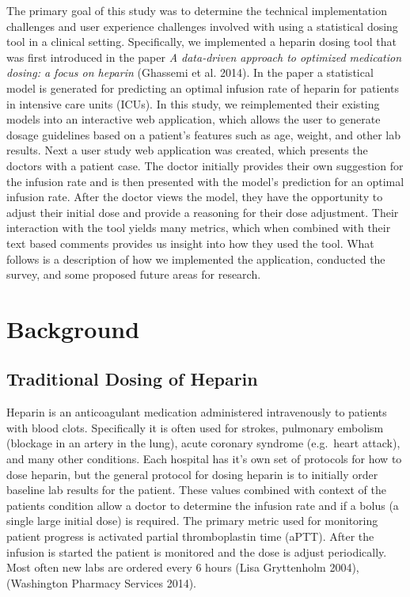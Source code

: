 \documentclass[12pt,a4paper,]{report}
\begin{document}
The primary goal of this study was to determine the technical
implementation challenges and user experience challenges involved with
using a statistical dosing tool in a clinical setting. Specifically, we
implemented a heparin dosing tool that was first introduced in the paper
\emph{A data-driven approach to optimized medication dosing: a focus on
heparin} (Ghassemi et al. 2014). In the paper a statistical model is
generated for predicting an optimal infusion rate of heparin for
patients in intensive care units (ICUs). In this study, we reimplemented
their existing models into an interactive web application, which allows
the user to generate dosage guidelines based on a patient's features
such as age, weight, and other lab results. Next a user study web
application was created, which presents the doctors with a patient case.
The doctor initially provides their own suggestion for the infusion rate
and is then presented with the model's prediction for an optimal
infusion rate. After the doctor views the model, they have the
opportunity to adjust their initial dose and provide a reasoning for
their dose adjustment. Their interaction with the tool yields many
metrics, which when combined with their text based comments provides us
insight into how they used the tool. What follows is a description of
how we implemented the application, conducted the survey, and some
proposed future areas for research.

\chapter{Background}\label{background}

\section{Traditional Dosing of
Heparin}\label{traditional-dosing-of-heparin}

Heparin is an anticoagulant medication administered intravenously to
patients with blood clots. Specifically it is often used for strokes,
pulmonary embolism (blockage in an artery in the lung), acute coronary
syndrome (e.g.~heart attack), and many other conditions. Each hospital
has it's own set of protocols for how to dose heparin, but the general
protocol for dosing heparin is to initially order baseline lab results
for the patient. These values combined with context of the patients
condition allow a doctor to determine the infusion rate and if a bolus
(a single large initial dose) is required. The primary metric used for
monitoring patient progress is activated partial thromboplastin time
(aPTT). After the infusion is started the patient is monitored and the
dose is adjust periodically. Most often new labs are ordered every 6
hours (Lisa Gryttenholm 2004), (Washington Pharmacy Services 2014).
\end{document}
